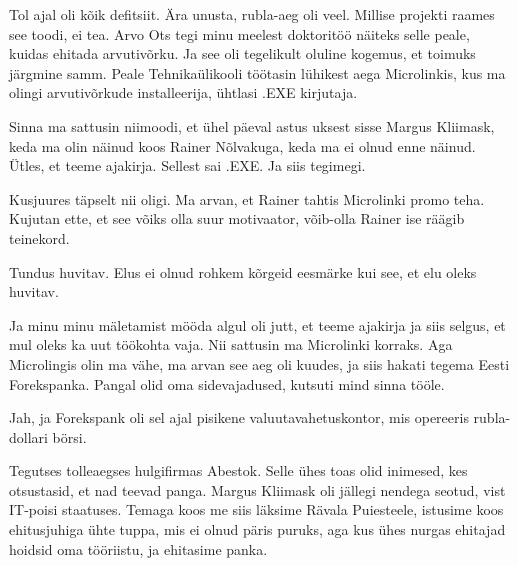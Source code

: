 
Tol ajal oli kõik defitsiit. Ära unusta, rubla-aeg oli veel. Millise projekti 
raames see toodi, ei tea. Arvo Ots tegi minu meelest 
doktoritöö näiteks selle peale, kuidas ehitada arvutivõrku. Ja see oli 
tegelikult oluline kogemus, et toimuks järgmine samm. Peale Tehnikaülikooli 
töötasin lühikest aega Microlinkis, kus ma olingi 
arvutivõrkude installeerija, ühtlasi .EXE kirjutaja.


Sinna ma sattusin niimoodi, et ühel päeval astus uksest sisse Margus 
Kliimask, keda ma olin näinud koos Rainer 
Nõlvakuga, keda ma ei olnud enne näinud. Ütles, et 
teeme ajakirja. Sellest sai .EXE. Ja siis tegimegi.


Kusjuures täpselt nii oligi. Ma arvan, et Rainer tahtis Microlinki promo teha. 
Kujutan ette, et see võiks olla suur motivaator, võib-olla Rainer ise räägib 
teinekord.


Tundus huvitav. Elus ei olnud rohkem kõrgeid eesmärke kui see, et elu oleks 
huvitav.


Ja minu minu mäletamist mööda algul oli jutt, et teeme ajakirja ja siis selgus, 
et mul oleks ka uut töökohta vaja. Nii sattusin ma Microlinki 
korraks. Aga Microlingis olin ma vähe, ma arvan see aeg oli kuudes, ja 
siis hakati tegema Eesti Forekspanka. Pangal olid oma sidevajadused, kutsuti mind sinna tööle.


Jah, ja Forekspank oli sel ajal pisikene valuutavahetuskontor, mis opereeris 
rubla-dollari börsi.

Tegutses tolleaegses hulgifirmas Abestok. Selle  ühes toas olid 
inimesed, kes otsustasid, et nad teevad panga. Margus 
Kliimask oli jällegi nendega seotud, vist IT-poisi 
staatuses. Temaga koos me siis läksime Rävala Puiesteele, istusime koos 
ehitusjuhiga ühte tuppa, mis ei olnud päris puruks, aga kus ühes nurgas 
ehitajad hoidsid oma tööriistu, ja ehitasime panka.

